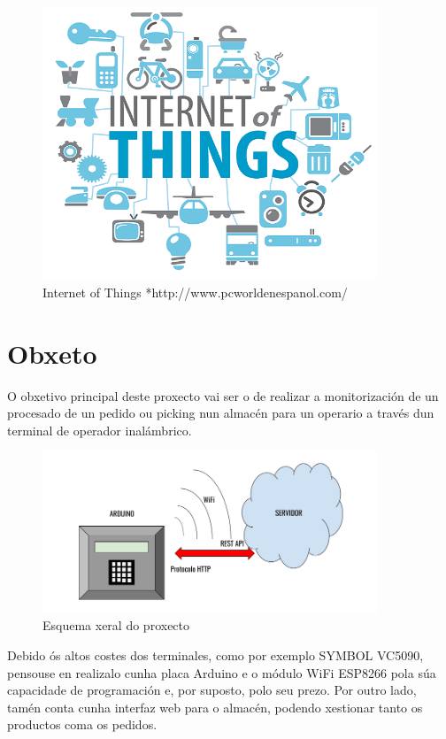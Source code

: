 \documentclass[11pt,twoside]{book}
\begin{document}
\begin{figure}[H]
	\begin{center}
		\includegraphics[width=10cm]{images/IoT.png}
	\end{center}
	\caption{Internet of Things *http://www.pcworldenespanol.com/}
	\label{fig:IoT}
\end{figure}

\section{Obxeto}

O obxetivo principal deste proxecto vai ser o de realizar a monitorización de un procesado de un pedido ou picking nun almacén para un operario a través dun terminal de operador inalámbrico.

\begin{figure}[H]
	\begin{center}
		\includegraphics[width=10cm]{images/esquema_xeral.png}
	\end{center}
	\caption{Esquema xeral do proxecto}
	\label{fig:IoT}
\end{figure}

Debido ós altos costes dos terminales, como por exemplo SYMBOL VC5090, pensouse en realizalo cunha placa Arduino e o módulo WiFi ESP8266 pola súa capacidade de programación e, por suposto, polo seu prezo.
Por outro lado, tamén conta cunha interfaz web para o almacén, podendo xestionar tanto os productos coma os pedidos.
\end{document}
